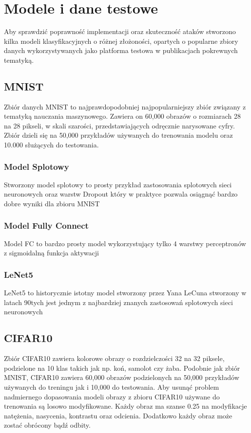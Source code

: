 \documentclass{article}
\begin{document}
\section{Modele i dane testowe}
Aby sprawdzić poprawność implementacji oraz skuteczność ataków stworzono
kilka modeli klasyfikacyjnych o różnej złożoności, opartych o popularne zbiory danych
wykorzystywanych jako platforma testowa w publikacjach pokrewnych tematyką.

    \subsection{MNIST}
    Zbiór danych MNIST  to najprawdopodobniej najpopularniejszy zbiór związany z
    tematyką nauczania maszynowego.
    Zawiera on 60,000 obrazów o rozmiarach 28 na 28 pikseli, w skali szarości, przedstawiających
    odręcznie narysowane cyfry. Zbiór dzieli się na 50,000 przykładów używanych do
    trenowania modelu oraz 10.000 służących do testowania.

    \subsubsection{Model Splotowy}
    Stworzony model splotowy to prosty przykład zastosowania splotowych sieci neuronowych oraz warstw Dropout
    który w praktyce pozwala osiągnąć bardzo dobre wyniki dla zbioru MNIST

        \subsubsection{Model Fully Connect}
        Model FC to bardzo prosty model wykorzystujący tylko 4 warstwy perceptronów z sigmoidalną funkcja aktywacji

        \subsubsection{LeNet5}
        LeNet5 to historycznie istotny model stworzony przez Yana LeCuna stworzony w latach 90tych
        jest jednym z najbardziej znanych zastosowań splotowych sieci neuronowych

    \subsection{CIFAR10}
    Zbiór CIFAR10  zawiera kolorowe obrazy o rozdzielczości 32 na 32 piksele,
    podzielone na 10 klas takich jak np. koń, samolot czy żaba. Podobnie jak zbiór MNIST, CIFAR10 zawiera
    60,000 obrazów podzielonych na 50,000 przykładów używanych do treningu jak i 10,000 do testowania.
    Aby usunąć problem nadmiernego dopasowania modeli obrazy z zbioru CIFAR10 używane
    do trenowania są losowo modyfikowane. Każdy obraz ma szanse 0.25  na
    modyfikacje natężenia, nasycenia, kontrastu oraz odcienia. Dodatkowo każdy obraz może zostać obrócony bądź odbity.
\end{document}

